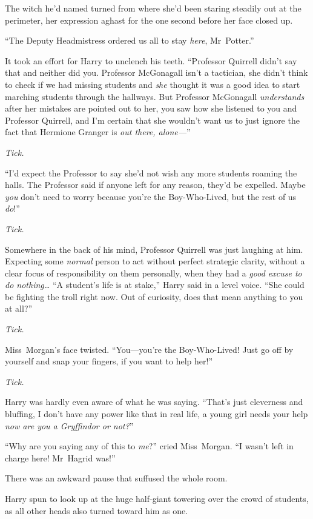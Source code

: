 The witch he’d named turned from where she’d been staring steadily out at the perimeter, her expression aghast for the one second before her face closed up.

“The Deputy Headmistress ordered us all to stay \emph{here}, Mr~Potter.”

It took an effort for Harry to unclench his teeth. “Professor Quirrell didn’t say that and neither did you. Professor McGonagall isn’t a tactician, she didn’t think to check if we had missing students and \emph{she} thought it was a good idea to start marching students through the hallways. But Professor McGonagall \emph{understands} after her mistakes are pointed out to her, you saw how she listened to you and Professor Quirrell, and I’m certain that she wouldn’t want us to just ignore the fact that Hermione Granger is \emph{out there, alone—}”

\emph{Tick.}

“I’d expect the Professor to say she’d not wish any more students roaming the halls. The Professor said if anyone left for any reason, they’d be expelled. Maybe \emph{you} don’t need to worry because you’re the Boy-Who-Lived, but the rest of us \emph{do}!”

\emph{Tick.}

Somewhere in the back of his mind, Professor Quirrell was just laughing at him. Expecting some \emph{normal} person to act without perfect strategic clarity, without a clear focus of responsibility on them personally, when they had a \emph{good excuse to do nothing…} “A student’s life is at stake,” Harry said in a level voice. “She could be fighting the troll right now. Out of curiosity, does that mean anything to you at all?”

\emph{Tick.}

Miss~Morgan’s face twisted. “You—you’re the Boy-Who-Lived! Just go off by yourself and snap your fingers, if you want to help her!”

\emph{Tick.}

Harry was hardly even aware of what he was saying. “That’s just cleverness and bluffing, I don’t have any power like that in real life, a young girl needs your help \emph{now are you a Gryffindor or not?}”

“Why are you saying any of this to \emph{me}?” cried Miss~Morgan. “I wasn’t left in charge here! Mr~Hagrid was!”

There was an awkward pause that suffused the whole room.

Harry spun to look up at the huge half-giant towering over the crowd of students, as all other heads also turned toward him as one.

